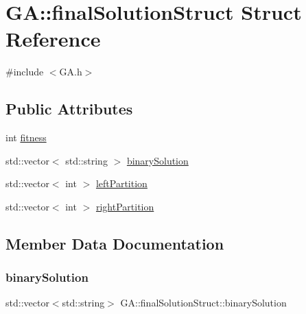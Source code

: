 \hypertarget{struct_g_a_1_1final_solution_struct}{}\section{GA\+:\+:final\+Solution\+Struct Struct Reference}
\label{struct_g_a_1_1final_solution_struct}


{\ttfamily \#include $<$G\+A.\+h$>$}

\subsection*{Public Attributes}
\begin{DoxyCompactItemize}
\item 
int \hyperlink{struct_g_a_1_1final_solution_struct_a3e55cdb1b7562714b90b82ca66ad983a}{fitness}
\item 
std\+::vector$<$ std\+::string $>$ \hyperlink{struct_g_a_1_1final_solution_struct_a1af467f3eb53235e34bafbec5d7866e2}{binary\+Solution}
\item 
std\+::vector$<$ int $>$ \hyperlink{struct_g_a_1_1final_solution_struct_aedc052fa2f16ac65ef65b23692177ab9}{left\+Partition}
\item 
std\+::vector$<$ int $>$ \hyperlink{struct_g_a_1_1final_solution_struct_a61ec4bab473d91916ca5fee656fb9a15}{right\+Partition}
\end{DoxyCompactItemize}


\subsection{Member Data Documentation}
\hypertarget{struct_g_a_1_1final_solution_struct_a1af467f3eb53235e34bafbec5d7866e2}{}\label{struct_g_a_1_1final_solution_struct_a1af467f3eb53235e34bafbec5d7866e2} 
\subsubsection{\texorpdfstring{binary\+Solution}{binarySolution}}
{\footnotesize\ttfamily std\+::vector$<$std\+::string$>$ G\+A\+::final\+Solution\+Struct\+::binary\+Solution}

\hypertarget{struct_g_a_1_1final_solution_struct_a3e55cdb1b7562714b90b82ca66ad983a}{}\label{struct_g_a_1_1final_solution_struct_a3e55cdb1b7562714b90b82ca66ad983a} 
